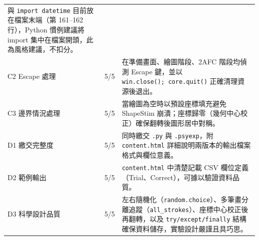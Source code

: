 \documentclass[14pt,]{extarticle}
\begin{document}
\begin{longtable}[]{@{}lll@{}}
\begin{minipage}[t]{0.81\columnwidth}
與 \texttt{import\ datetime} 目前放在檔案末端（第 161--162 行），Python
慣例建議將 import 集中在檔案開頭，此為風格建議，不扣分。\strut
\end{minipage}\tabularnewline
\begin{minipage}[t]{0.08\columnwidth}\raggedright
C2 Escape 處理\strut
\end{minipage} & \begin{minipage}[t]{0.02\columnwidth}\raggedright
5/5\strut
\end{minipage} & \begin{minipage}[t]{0.81\columnwidth}\raggedright
在準備畫面、繪圖階段、2AFC 階段均偵測 Escape 鍵，並以
\texttt{win.close();\ core.quit()} 正確清理資源後退出。\strut
\end{minipage}\tabularnewline
\begin{minipage}[t]{0.08\columnwidth}\raggedright
C3 邊界情況處理\strut
\end{minipage} & \begin{minipage}[t]{0.02\columnwidth}\raggedright
5/5\strut
\end{minipage} & \begin{minipage}[t]{0.81\columnwidth}\raggedright
當繪圖為空時以預設座標填充避免 ShapeStim
崩潰；座標歸零（幾何中心校正）確保翻轉後圖形居中對稱。\strut
\end{minipage}\tabularnewline
\begin{minipage}[t]{0.08\columnwidth}\raggedright
D1 繳交完整度\strut
\end{minipage} & \begin{minipage}[t]{0.02\columnwidth}\raggedright
5/5\strut
\end{minipage} & \begin{minipage}[t]{0.81\columnwidth}\raggedright
同時繳交 \texttt{.py} 與 \texttt{.psyexp}，附 \texttt{content.html}
詳細說明兩版本的輸出檔案格式與欄位意義。\strut
\end{minipage}\tabularnewline
\begin{minipage}[t]{0.08\columnwidth}\raggedright
D2 範例輸出\strut
\end{minipage} & \begin{minipage}[t]{0.02\columnwidth}\raggedright
5/5\strut
\end{minipage} & \begin{minipage}[t]{0.81\columnwidth}\raggedright
\texttt{content.html} 中清楚記載 CSV
欄位定義（Trial、Correct），可據以驗證資料品質。\strut
\end{minipage}\tabularnewline
\begin{minipage}[t]{0.08\columnwidth}\raggedright
D3 科學設計品質\strut
\end{minipage} & \begin{minipage}[t]{0.02\columnwidth}\raggedright
5/5\strut
\end{minipage} & \begin{minipage}[t]{0.81\columnwidth}\raggedright
左右隨機化（\texttt{random.choice}）、多筆畫分離追蹤（\texttt{all\_strokes}）、座標中心校正後再翻轉，以及
\texttt{try/except/finally}
結構確保資料儲存，實驗設計嚴謹且具巧思。\strut
\end{minipage}\tabularnewline
\bottomrule
\end{longtable}
\end{document}
